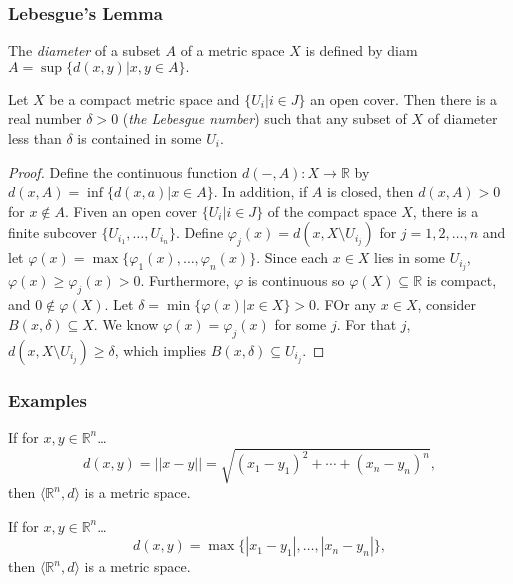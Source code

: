 \subsubsection{Lebesgue's Lemma}

\label{diameter}
The \emph{diameter} of a subset $A$ of a metric space $X$ is defined by diam $A = \sup\{d(x,y) | x,y \in A \}.$

\begin{lemma}
\label{lebesguelemma}
Let $X$ be a compact metric space and $\{ U_i | i \in J \}$ an open cover. Then there is a real number
$\delta > 0$ (\emph{the Lebesgue number}\label{lebesguenumber}) such that any subset of $X$ of diameter less than $\delta$
is contained in some $U_i$.
\end{lemma}

\begin{proof}
Define the continuous function $d(-,A): X \rightarrow \mathbb{R}$ by $d(x, A) = \inf\{d(x,a) | x \in A \}$. In addition,
if $A$ is closed, then $d(x,A) > 0$ for $x \not \in A$. Fiven an open cover $\{ U_i | i \in J \}$ of the compact space $X$,
there is a finite subcover $\{U_{i_1},\dots, U_{i_n} \}$. Define $\varphi_j(x) = d(x,X \setminus U_{i_j})$ for $j = 1,2,\dots, n$
and let $\varphi(x) = \max\{\varphi_1(x), \dots, \varphi_n(x) \}$. Since each $x \in X$ lies in some $U_{i_j}$, $\varphi(x) \geq \varphi_j(x) > 0$.
Furthermore, $\varphi$ is continuous so $\varphi(X) \subseteq \mathbb{R}$ is compact, and $0 \not \in \varphi(X)$. Let $\delta = \min \{ \varphi(x) | x \in X \} > 0$.
FOr any $x \in X$, consider $B(x, \delta) \subseteq X$. We know $\varphi(x) = \varphi_j(x)$ for some $j$. For that $j$, $d(x,X \setminus U_{i_j}) \geq \delta$, which implies
$B(x, \delta) \subseteq U_{i_j}$.
\end{proof}

\subsubsection{Examples}\label{metricexamples}

\label{euclideanmetric}

If for $x,y \in \mathbb{R}^n$\dots
$$d(x,y) = ||x-y|| = \sqrt{(x_1 - y_1)^2 + \cdots + (x_n - y_n)^n},$$
then $\langle \mathbb{R}^n,d \rangle$ is a metric space.

\label{euclideanmetric}

If for $x,y \in \mathbb{R}^n$\dots
$$d(x,y) = \max\{|x_1 - y_1|, \dots, |x_n - y_n|\},$$
then $\langle \mathbb{R}^n,d \rangle$ is a metric space.\newline

